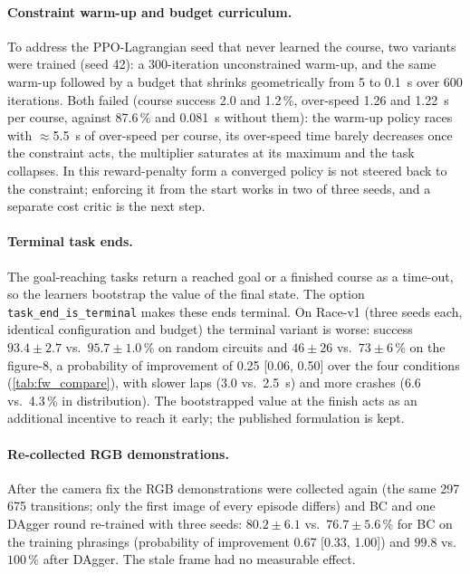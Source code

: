 \paragraph{Constraint warm-up and budget curriculum.} To address the PPO-Lagrangian seed that never learned the course,
two variants were trained (seed 42): a 300-iteration unconstrained warm-up, and the same warm-up followed by a budget
that shrinks geometrically from 5 to \SI{0.1}{s} over 600 iterations. Both failed (course success 2.0 and 1.2\,\%,
over-speed 1.26 and \SI{1.22}{s} per course, against 87.6\,\% and \SI{0.081}{s} without them): the warm-up policy
races with $\approx$\SI{5.5}{s} of over-speed per course, its over-speed time barely decreases once the constraint
acts, the multiplier saturates at its maximum and the task collapses. In this reward-penalty form a converged policy
is not steered back to the constraint; enforcing it from the start works in two of three seeds, and a separate cost
critic is the next step.

\paragraph{Terminal task ends.} The goal-reaching tasks return a reached goal or a finished course as a time-out, so
the learners bootstrap the value of the final state. The option \texttt{task\_end\_is\_terminal} makes these ends
terminal. On Race-v1 (three seeds each, identical configuration and budget) the terminal variant is worse: success
$93.4\pm2.7$ vs.\ $95.7\pm1.0$\,\% on random circuits and $46\pm26$ vs.\ $73\pm6$\,\% on the figure-8, a
probability of improvement of 0.25 [0.06, 0.50] over the four conditions (\cref{tab:fw_compare}), with slower laps
(3.0 vs.\ \SI{2.5}{s}) and more crashes (6.6 vs.\ 4.3\,\% in distribution). The bootstrapped value at the finish
acts as an additional incentive to reach it early; the published formulation is kept.

\paragraph{Re-collected RGB demonstrations.} After the camera fix the RGB demonstrations were collected again (the
same 297\,675 transitions; only the first image of every episode differs) and BC and one DAgger round re-trained
with three seeds: $80.2\pm6.1$ vs.\ $76.7\pm5.6$\,\% for BC on the training phrasings (probability of improvement
0.67 [0.33, 1.00]) and $99.8$ vs.\ $100$\,\% after DAgger. The stale frame had no measurable effect.

